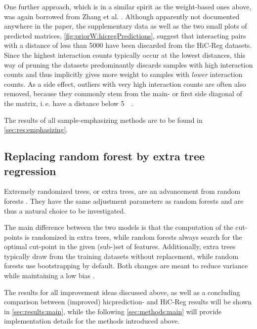 One further approach, which is in a similar spirit as the weight-based ones above,
was again borrowed from Zhang et al. \cite{Zhang2019}. 
Although apparently not documented anywhere in the paper,
the supplementary data as well as the two small plots of predicted matrices, 
\autoref{fig:priorW:hicregPredictions},
suggest that interacting pairs with a distance of less than \SI{5000}{\bp} have been discarded
from the HiC-Reg datasets. 
Since the highest interaction counts typically occur at the lowest distances,
this way of pruning the datasets predominantly discards samples with high interaction counts
and thus implicitly gives more weight to samples with \emph{lower} interaction counts.
As a side effect, outliers with very high interaction counts are often also removed,
because they commonly stem from the main- or first side diagonal of the matrix, i.\,e. have a distance below \SI{5}{\kilo\bp}.

The results of all sample-emphasizing methods are to be found in \autoref{sec:res:emphasizing}.

\subsection{Replacing random forest by extra tree regression}
Extremely randomized trees, or extra trees, are an advancement from random forests \cite{Geurts2006}.
They have the same adjustment parameters as random forests and are thus a natural choice to be investigated.

The main difference between the two models is that the computation of the cut-points is randomized in extra trees,
while random forests always search for the optimal cut-point in the given (sub-)set of features.
Additionally, extra trees typically draw from the training datasets without replacement,
while random forests use bootstrapping by default.
Both changes are meant to reduce variance while maintaining a low bias \cite{Geurts2006}.

The results for all improvement ideas discussed above, as well as a concluding comparison between
(improved) hicprediction- and HiC-Reg results will be shown in \autoref{sec:results:main},
while the following \autoref{sec:methods:main} will provide implementation details for the methods introduced above.

